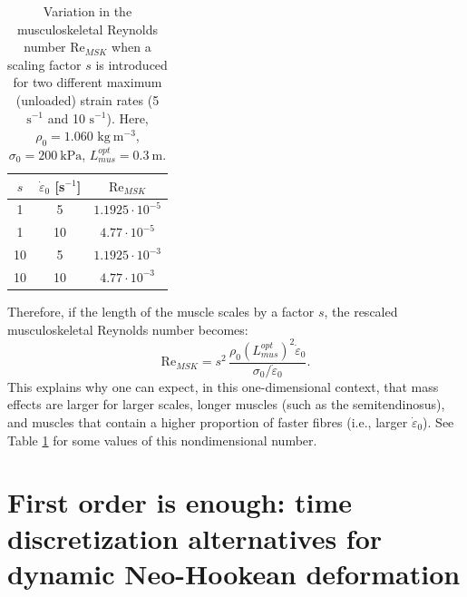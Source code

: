 \documentclass{sfuthesis}
\numberwithin{equation}{section}
\numberwithin{figure}{chapter}
\numberwithin{table}{chapter}
\theoremstyle{definition}
\newcommand{\depsilon}{\dot{\varepsilon}}
\begin{document}
\begin{table}
    \centering
    \begin{tabular}{|c|c|c|} \hline
        $s$ & $\depsilon_0$ [s$^{-1}$] & $\text{Re}_{MSK}$ \\\hline
        1 & 5 & $1.1925 \cdot 10^{-5}$ \\\hline
        1 & 10 & $4.77 \cdot 10^{-5}$ \\\hline
        10 & 5 & $1.1925 \cdot 10^{-3}$  \\\hline
        10 & 10 & $4.77 \cdot 10^{-3}$  \\\hline
    \end{tabular}
    \caption{Variation in the musculoskeletal Reynolds number $\text{Re}_{MSK}$ when a scaling factor $s$ is introduced for two different maximum (unloaded) strain rates (5 $\text{s}^{-1}$ and 10 $\text{s}^{-1}$). Here, $\rho_0 = 1.060 \text{ kg} \ \text{m}^{-3}$, $\sigma_0 = 200 \ \text{kPa}$, $L_{mus}^{opt} = 0.3 \ \text{m}$.}
    \label{tab:re_msk}
\end{table}

Therefore, if the length of the muscle scales by a factor $s$, the rescaled musculoskeletal Reynolds number becomes:
\begin{equation}
    \text{Re}_{MSK} = s^2 \, \dfrac{\rho_0 (L_{mus}^{opt})^2 \depsilon_0}{\sigma_0 / \depsilon_0}.
\end{equation}
This explains why one can expect, in this one-dimensional context, that mass effects are larger for larger scales, longer muscles (such as the semitendinosus), and muscles that contain a higher proportion of faster fibres (i.e., larger $\depsilon_0$). See Table \ref{tab:re_msk} for some values of this nondimensional number. 


\chapter{First order is enough: time discretization alternatives for dynamic Neo-Hookean deformation} \label{ch:neohookean}


\end{document}
